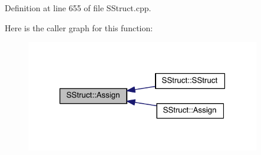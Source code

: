 Definition at line 655 of file S\+Struct.\+cpp.



Here is the caller graph for this function\+:
\nopagebreak
\begin{figure}[H]
\begin{center}
\leavevmode
\includegraphics[width=290pt]{class_s_struct_a661fc1833eccb901e361b644c756c2c1_icgraph}
\end{center}
\end{figure}



